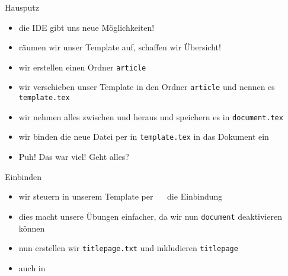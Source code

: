 
\begin{frame}[fragile]{Hausputz}
    \begin{itemize}[<+->]
        \item die IDE gibt uns neue Möglichkeiten!
        \item räumen wir unser Template auf, schaffen wir Übersicht!
        \item wir erstellen einen Ordner \texttt{article}
        \item wir verschieben unser Template in den Ordner \texttt{article} und nennen es \texttt{template.tex}
        \item wir nehmen alles zwischen \lstinline|| und \lstinline|| heraus und speichern es in \texttt{document.tex}
        \item wir binden die neue Datei per \lstinline|| in \texttt{template.tex} in das Dokument ein
        \item Puh! Das war viel! Geht alles?
    \end{itemize}
\end{frame}

\begin{frame}[fragile]{Einbinden}
    \begin{itemize}[<+->]
        \item wir steuern in unserem Template per \lstinline|  | die Einbindung
        \item dies macht unsere Übungen einfacher, da wir nun \texttt{document} deaktivieren können
        \item nun erstellen wir \texttt{titlepage.txt} und inkludieren \texttt{titlepage}
        \item auch in \lstinline|  |
    \end{itemize}
\end{frame}